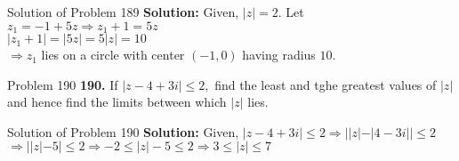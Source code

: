 \documentclass[aspectratio=169,8pt]{beamer}
\begin{document}
\begin{frame}{Solution of Problem 189}
  \textbf{Solution:} Given, $|z| = 2$. Let $z_1 = -1 + 5z \Rightarrow z_1 + 1 = 5z$\\
  \vspace*{0.2cm}
  $|z_1 + 1| = |5z| = 5|z| = 10$\\
  \vspace*{0.2cm}
  $\Rightarrow z_1$ lies on a circle with center $(-1, 0)$ having radius $10$.
\end{frame}
\begin{frame}{Problem 190}
  \textbf{190.} If $|z - 4 + 3i|\leq 2,$ find the least and tghe greatest values of $|z|$ and hence find the limits between which
  $|z|$ lies.
\end{frame}
\begin{frame}{Solution of Problem 190}
  \textbf{Solution:} Given, $|z - 4 + 3i|\leq 2 \Rightarrow ||z| - |4 - 3i||\leq 2$\\
  \vspace*{0.2cm}
  $\Rightarrow ||z| - 5|\leq 2 \Rightarrow -2 \leq |z| - 5\leq 2 \Rightarrow 3\leq |z|\leq 7$
\end{frame}
\end{document}
